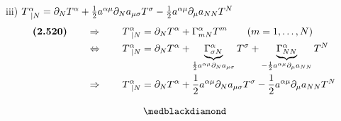 iii) $T^{\alpha}_{\ |N} = \partial_{N}T^{\alpha}  + \frac{1}{2} a^{\alpha\mu} \partial_N a_{\mu\sigma}T^{\sigma} - \frac{1}{2} a^{\alpha\mu}  \partial_{\mu} a_{NN}T^{N}$\\
\begin{align}
\textbf{(2.520)}\quad\quad \Rightarrow \quad\quad T^{\alpha}_{\ |N} &= \partial_{N}T^{\alpha}+\Gamma^{\alpha}_{mN}T^m \quad\quad\text{(}m = 1,\dots,N \text{)}\\
\Leftrightarrow \quad\quad T^{\alpha}_{\ |N} &=  \partial_{N}T^{\alpha}+ \underbrace{\Gamma^{\alpha}_{\sigma N }}_{ \frac{1}{2} a^{\alpha \mu}\partial_N a_{\mu\sigma}}  T^{\sigma }+\underbrace{\Gamma^{\alpha}_{N N}}_{ -\frac{1}{2} a^{\alpha\mu}\partial_{\mu} a_{NN}}T^{N}\\
\Rightarrow \quad\quad T^{\alpha}_{\ |N} &=  \partial_{N}T^{\alpha}+ \frac{1}{2} a^{\alpha \mu}\partial_N a_{\mu\sigma}T^{\sigma } -\frac{1}{2} a^{\alpha\mu}\partial_{\mu} a_{NN}T^{N}
\end{align}


$$\medblackdiamond$$
\newpage